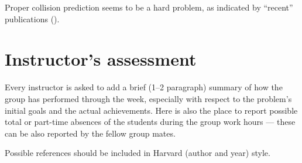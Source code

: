 \documentclass[12pt, sumlimits, intlimits]{article}
\begin{document}
Proper collision prediction seems to be a hard problem,
as indicated by ``recent'' publications (\cite{kim-2003}).

\section{Instructor's assessment}

Every instructor is asked to add a brief (1--2 paragraph) summary of how the
group has performed through the week, especially with respect to the problem's
initial goals and the actual achievements. Here is also the place to report
possible total or part-time absences of the students during the group work
hours --- these can be also reported by the fellow group mates.

\clearpage

\thispagestyle{empty}

Possible references should be included in Harvard (author and year) style.

\printbibliography
\end{document}
